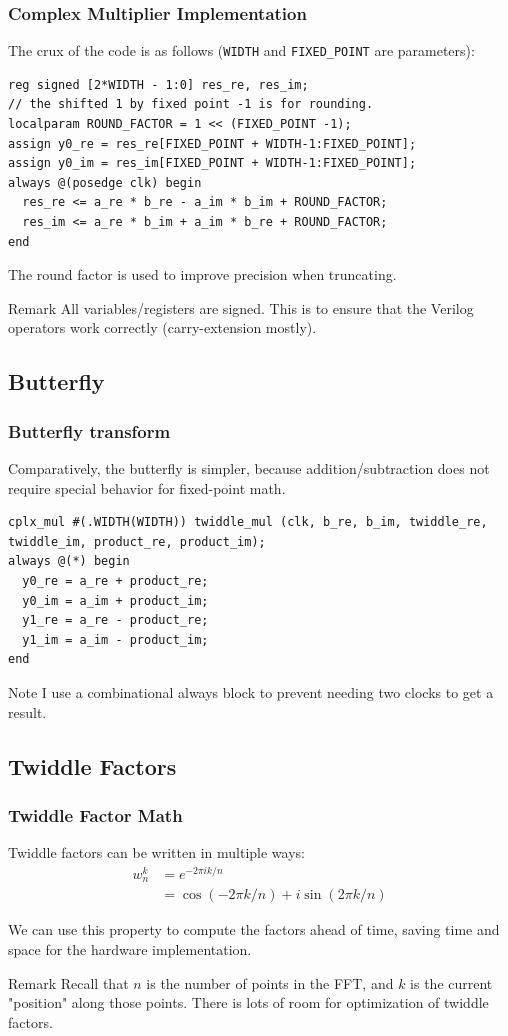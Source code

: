 \documentclass{beamer}
\begin{document}
\begin{frame}[fragile]
	\frametitle{Complex Multiplier Implementation}
	The crux of the code is as follows 
	(\texttt{WIDTH} and \texttt{FIXED\_POINT} are parameters):
\begin{verbatim}
reg signed [2*WIDTH - 1:0] res_re, res_im;
// the shifted 1 by fixed point -1 is for rounding.
localparam ROUND_FACTOR = 1 << (FIXED_POINT -1);
assign y0_re = res_re[FIXED_POINT + WIDTH-1:FIXED_POINT];
assign y0_im = res_im[FIXED_POINT + WIDTH-1:FIXED_POINT];
always @(posedge clk) begin
  res_re <= a_re * b_re - a_im * b_im + ROUND_FACTOR;
  res_im <= a_re * b_im + a_im * b_re + ROUND_FACTOR;
end
\end{verbatim}
The round factor is used to improve precision when truncating.
\pause
\begin{block}{Remark}
	All variables/registers are signed. This is to ensure that the Verilog operators
	work correctly (carry-extension mostly).
\end{block}
\end{frame}

\subsection{Butterfly}
\begin{frame}[fragile]
	\frametitle{Butterfly transform}
	Comparatively, the butterfly is simpler, because addition/subtraction does not require
	special behavior for fixed-point math.
\begin{verbatim}
cplx_mul #(.WIDTH(WIDTH)) twiddle_mul (clk, b_re, b_im, twiddle_re, twiddle_im, product_re, product_im);
always @(*) begin
  y0_re = a_re + product_re;
  y0_im = a_im + product_im;
  y1_re = a_re - product_re;
  y1_im = a_im - product_im;
end
\end{verbatim}
\begin{block}{Note}
I use a combinational always block to prevent needing two clocks to get a result.
\end{block}
\end{frame}

\subsection{Twiddle Factors}

\begin{frame}
	\frametitle{Twiddle Factor Math}
	Twiddle factors can be written in multiple ways:
	\begin{align*}
		w_n^k &= e^{-2\pi i k / n} \\
		      &= \cos(-2\pi k / n) + i\sin(2\pi k / n)
	\end{align*}
	\pause

	We can use this property to compute the factors ahead of time, saving
	time and space for the hardware implementation.
	\begin{block}{Remark}
		Recall that $n$ is the number of points in the FFT, and $k$ is
		the current "position" along those points. There is lots of
		room for optimization of twiddle factors.
	\end{block}
\end{frame}
\end{document}
